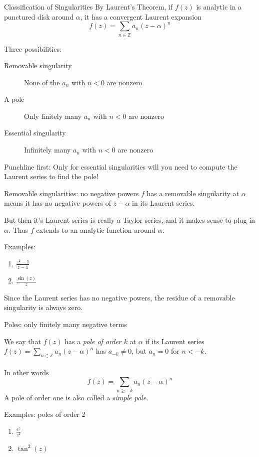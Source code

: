 \documentclass{beamer}
\newcommand{\Z}{\mathbb{Z}}
\begin{document}
\begin{frame}{Classification of Singularities}
By Laurent's Theorem, if $f(z)$ is analytic in a punctured disk around $\alpha$, it has a convergent Laurent expansion
$$f(z)=\sum_{n\in\Z} a_n (z-\alpha)^n$$
\begin{block}{Three possibilities:}
\begin{description}
   \item[Removable singularity] None of the $a_n$ with $n<0$ are nonzero
       \item[A pole] Only finitely many $a_n$ with $n<0$ are nonzero
    \item[Essential singularity] Infinitely many $a_n$ with $n<0$ are nonzero

\end{description}
\end{block}

\begin{block}{Punchline first:}
Only for essential singularities will you need to compute the Laurent series to find the pole!
\end{block}

\end{frame}


\begin{frame}{Removable singularities: no negative powers}
$f$ has a removable singularity at $\alpha$ means it has no negative powers of $z-\alpha$ in its Laurent series.  

But then it's Laurent series is really a Taylor series, and it makes sense to plug in $\alpha$.  Thus $f$ extends to an analytic function around $\alpha$.  
\begin{block}{Examples:}
\begin{enumerate}
\item $\frac{z^2-1}{z-1}$
\item $\frac{\sin(z)}{z}$
\end{enumerate}
\end{block}

Since the Laurent series has no negative powers, the residue of a removable singularity is always zero.
\end{frame}


\begin{frame}{Poles: only finitely many negative terms}
\begin{definition}
We say that $f(z)$ has a \emph{pole of order $k$} at $\alpha$ if its Laurent series $f(z)=\sum_{n\in\Z} a_n(z-\alpha)^n$ has $a_{-k}\neq 0$, but $a_{n}=0$ for $n<-k$.
\\ ~ \\
In other words
$$f(z)=\sum_{n\geq -k} a_n (z-\alpha)^n$$
A pole of order one is also called a \emph{simple pole}.
\end{definition}
\begin{block}{Examples: poles of order 2} 
\begin{enumerate}
    \item $\frac{e^z}{z^2}$
    \item $\tan^2(z)$
  \end{enumerate}
\end{block}


\end{frame}
\end{document}
